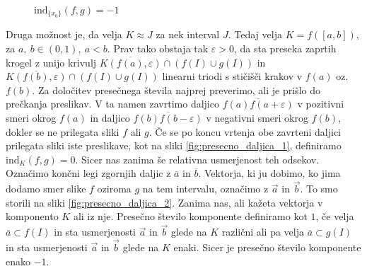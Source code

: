 \documentclass[mat1]{fmfdelo}
\newcommand{\ind}[3][]{\text{ind}_{#1}(#2, #3)}
\begin{document}
\begin{figure}[h!]
\begin{minipage}{0.5\textwidth}
	\centering
	\caption{$\ind[\{x_0\}]{f}{g} = 0$}
	\label{fig:presecno_tocka_1}
\end{minipage}\hfill
\begin{minipage}{0.5\textwidth}
	\centering
	\caption{$\ind[\{x_0\}]{f}{g} = -1$}
	\label{fig:presecno_tocka_2}
\end{minipage}
\end{figure}

Druga možnost je, da velja $K \approx J$ za nek interval $J$. Tedaj velja $K = f([a, b])$, za $a,\ b \in (0, 1),\ a < b.$ Prav tako obstaja tak $\varepsilon > 0$, da sta preseka zaprtih krogel z unijo krivulj $\overline{K(f(a), \varepsilon)} \cap (f(I) \cup g(I))$ in $\overline{K(f(b), \varepsilon)} \cap (f(I) \cup g(I))$ linearni triodi s stičišči krakov v $f(a)$ oz. $f(b).$ Za določitev presečnega števila najprej preverimo, ali je prišlo do prečkanja preslikav. V ta namen zavrtimo daljico $\overline{f(a)f(a+\varepsilon)}$ v pozitivni smeri okrog $f(a)$ in daljico $\overline{f(b)f(b-\varepsilon)}$ v negativni smeri okrog $f(b)$, dokler se ne prilegata sliki $f$ ali $g$. Če se po koncu vrtenja obe zavrteni daljici prilegata sliki iste preslikave, kot na sliki \ref{fig:presecno_daljica_1}, definiramo $\ind[K]{f}{g} = 0.$ Sicer nas zanima še relativna usmerjenost teh odsekov. Označimo končni legi zgornjih daljic z $\overline{a}$ in $\overline{b}$. Vektorja, ki ju dobimo, ko jima dodamo smer slike $f$ oziroma $g$ na tem intervalu, označimo z $\overrightarrow{a}$ in $\overrightarrow{b}$. To smo storili na sliki \ref{fig:presecno_daljica_2}. Zanima nas, ali kažeta vektorja v komponento $K$ ali iz nje. Presečno število komponente definiramo kot $1$, če velja $\overline{a} \subset f(I)$ in sta usmerjenosti $\overrightarrow{a}$ in $\overrightarrow{b}$ glede na $K$ različni ali pa velja $\overline{a} \subset g(I)$ in sta usmerjenosti $\overrightarrow{a}$ in $\overrightarrow{b}$ glede na $K$ enaki. Sicer je presečno število komponente enako $-1$. 
\end{document}
